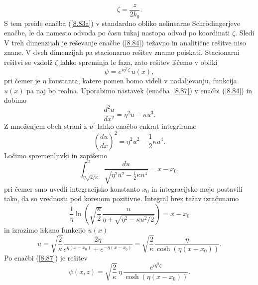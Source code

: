 \begin{equation}
\zeta=\frac{z}{2k_{0}}.
\end{equation}
 S tem preide enačba (\ref{8.83a}) v standardno obliko nelinearne Schr\"odingerjeve
enačbe, le da namesto odvoda po času tukaj nastopa odvod po koordinati $\zeta$. Sledi
V treh dimenzijah je reševanje enačbe (\ref{8.84}) težavno in analitične
rešitve niso znane. V dveh dimenzijah pa stacionarno rešitev znamo
poiskati. Stacionarni rešitvi se vzdolž $\zeta$ lahko spreminja le faza, zato
rešitev iščemo v obliki 
\begin{equation}
\psi=e^{i\eta^{2}\zeta}\, u(x),
\label{8.87}
\end{equation}
pri čemer je $\eta$ konstanta, katere pomen bomo videli v nadaljevanju, 
 funkcija $u(x)$ pa naj bo realna. 
Uporabimo nastavek (enačba~\ref{8.87}) v enačbi (\ref{8.84}) in dobimo
\begin{equation}
\frac{d^{2}u}{dx^{2}}=\eta^{2}u-\kappa u^{3}.
\end{equation}
 Z množenjem obeh strani z $u^{\prime}$ lahko enačbo enkrat integriramo
\begin{equation}
\left(\frac{du}{dx}\right)^{2}=\eta^{2}u^{2}-\frac{1}{2}\kappa u^{4}.
\end{equation}
Ločimo spremenljivki in zapišemo 
\begin{equation}
\int_{\eta\sqrt{2/\kappa}}^{u}\frac{du}{\sqrt{\eta^{2}u^2-\frac{1}{2}\kappa u^{4}}}=x-x_{0},
\label{8.85}
\end{equation}
pri čemer smo uvedli integracijsko konstanto $x_{0}$ in integracijsko mejo postavili 
tako, da so vrednosti pod korenom pozitivne.
Integral brez težav izračunamo
\begin{equation}
\frac{1}{\eta}\ln\left(\sqrt{\frac{\kappa}{2}}\frac{u}{\eta+
\sqrt{\eta^{2}-\kappa u^{2}/2}}\right)=x-x_{0}
\end{equation}
in izrazimo iskano funkcijo $u(x)$
\begin{equation}
u=\sqrt{\frac{2}{\kappa}}\frac{2 \eta }{e^{\eta(x-x_{0})}+e^{-\eta(x-x_{0})}}=
\sqrt{\frac{2}{\kappa}}\frac{\eta}{\cosh \left(\eta(x-x_{0})\right)}.
\label{8.86}
\end{equation}
Po enačbi (\ref{8.87}) je rešitev
\begin{equation}
\psi(x,z)=\sqrt{\frac{2}{\kappa}}\,\eta\,\frac{e^{i\eta^{2}\zeta}}{\cosh \left(\eta(x-x_{0})\right)}.
\label{8.88}
\end{equation}
